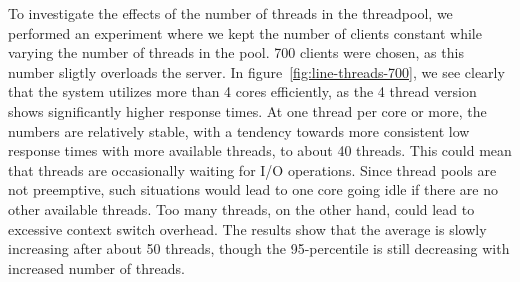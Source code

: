 To investigate the effects of the number of threads in the threadpool,
we performed an experiment where we kept the number of clients
constant while varying the number of threads in the pool. 700 clients
were chosen, as this number sligtly overloads the server. In
figure~\ref{fig:line-threads-700}, we see clearly that the system
utilizes more than 4 cores efficiently, as the 4 thread version shows
significantly higher response times. At one thread per core or more,
the numbers are relatively stable, with a tendency towards more
consistent low response times with more available threads, to about 40
threads. This could mean that threads are occasionally waiting for I/O
operations. Since thread pools are not preemptive, such situations
would lead to one core going idle if there are no other available
threads. Too many threads, on the other hand, could lead to excessive
context switch overhead. The results show that the average is slowly increasing after about 50 threads, though the 95-percentile is still decreasing with increased number of threads.



